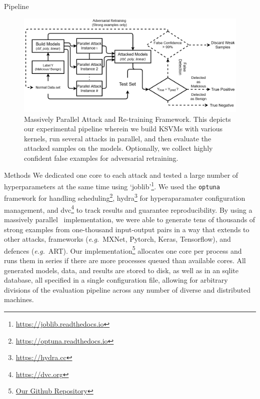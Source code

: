 \documentclass{beamer}
\begin{document}
\begin{frame}{Pipeline}
  \begin{figure}
\centering
\includegraphics[width=\textwidth]{./generated/PPGD.png}

\label{fig:attack_framework}
\caption{Massively Parallel Attack and Re-training Framework.  This depicts our experimental pipeline wherein we build KSVMs with various kernels, run several attacks in parallel, and then evaluate the attacked samples on the models. Optionally, we collect highly confident false examples for adversarial retraining.}
\end{figure}
\end{frame}

\begin{frame}{Methods}
\small
We dedicated one core to each attack and tested a large number of hyperparameters at the same time using `joblib'\footnote{\href{https://joblib.readthedocs.io}{https://joblib.readthedocs.io}}. We used the \texttt{optuna}~\cite{optuna} framework for handling scheduling\footnote{\href{https://optuna.readthedocs.io}{https://optuna.readthedocs.io}}, hydra\footnote{\href{https://hydra.cc}{https://hydra.cc}} for hyperaparamater configuration management, and dvc\footnote{\href{https://dvc.org}{https://dvc.org}} to track results and guarantee reproducibility.
  By using a massively parallel~\cite{optuna} implementation, we were able to generate tens of thousands of strong examples from one-thousand input-output pairs in a way that extends to other attacks, frameworks (\textit{e.g.}~MXNet, Pytorch, Keras, Tensorflow), and defences (\textit{e.g.}~ART). Our implementation\footnote{\href{https://github.com/simplymathematics/deckard}{Our Github Repository}} allocates one core per process and runs them in series if there are more processes queued than available cores. All generated models, data, and results are stored to disk, as well as in an sqlite database, all specified in a single configuration file, allowing for arbitrary divisions of the evaluation pipeline across any number of diverse and distributed machines.
\end{frame}
\end{document}
